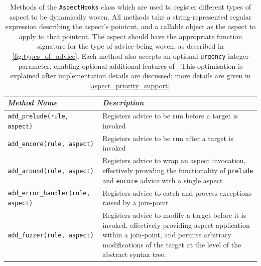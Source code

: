 \begin{table}
    \centering
    \begin{tabular}{@{}lp{}@{}}
        \toprule
        \emph{Method Name} & \emph{Description}\\
        \midrule
        \lstinline[]$add_prelude(rule, aspect)$ &
            Registers advice to be run before a target is invoked\\
        \rule{0pt}{2em}\lstinline[]$add_encore(rule, aspect)$ &
            Registers advice to be run after a target is invoked\\
        \rule{0pt}{2em}\lstinline[]$add_around(rule, aspect)$ &
            Registers advice to wrap an aspect invocation, effectively providing
            the functionality of \lstinline[]$prelude$ and \lstinline[]$encore$
            advice with a single aspect\\
        \rule{0pt}{2em}\lstinline[]$add_error_handler(rule, aspect)$ &
            Registers advice to catch and process exceptions raised by a join-point\\
        \rule{0pt}{2em}\lstinline[]$add_fuzzer(rule, aspect)$ &
            Registers advice to modify a target before it is invoked,
            effectively providing aspect application within a join-point, and
            permits arbitrary modifications of the target at the level of the
            abstract syntax tree.\\
        \bottomrule
    \end{tabular}
    \caption{Methods of the \lstinline{AspectHooks} class which are used to
    register different types of aspect to be dynamically woven. All methods take
    a string-represented regular expression describing the aspect's pointcut,
    and a callable object as the aspect to apply to that pointcut. The aspect
    should have the appropriate function signature for the type of advice being
    woven, as described in \cref{fig:types_of_advice}. Each method also accepts an
    optional \lstinline{urgency} integer parameter, enabling optional additional
    features of \pdsf{}. This optimisation is explained after implementation
    details are discussed; more details are given in
    \cref{aspect_priority_support}.}
    \label{aspect_registration_methods}
\end{table}


